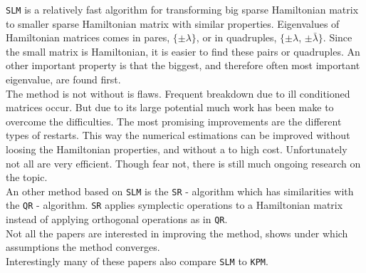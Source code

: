 \texttt{SLM} is a relatively fast algorithm for transforming big sparse Hamiltonian matrix to smaller sparse Hamiltonian matrix with similar properties. Eigenvalues of Hamiltonian matrices comes in pares, $\{ \pm \lambda \} $, or in quadruples, $\{ \pm \lambda $, $\pm \bar{\lambda} \} $. Since the small matrix is Hamiltonian, it is easier to find these pairs or quadruples. An other important property is that the biggest, and therefore often most important eigenvalue, are found first.\\

The method is not without is flaws. Frequent breakdown due to ill conditioned matrices occur. But due to its large potential much work has been make to overcome the difficulties. The most promising improvements are the different types of restarts. This way the numerical estimations can be improved without loosing the Hamiltonian properties, and without a to high cost.
Unfortunately not all are very efficient. Though fear not, there is still much ongoing research on the topic. \\

An other method based on \texttt{SLM} is the \texttt{SR} - algorithm which has similarities with the \texttt{QR} - algorithm. \texttt{SR} applies symplectic operations to a Hamiltonian matrix instead of applying orthogonal operations as in \texttt{QR}. \\

Not all the papers are interested in improving the method, \cite{SLM4} shows under which assumptions the method converges. \\

Interestingly many of these papers also compare \texttt{SLM} to \texttt{KPM}.


 
